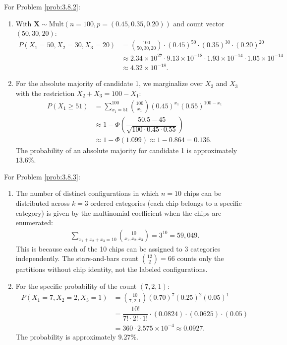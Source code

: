 \begin{solucion}
	\label{sol:3.8.2}
	For Problem \ref{prob:3.8.2}:
	\begin{enumerate}
		\item With $\bm{X} \sim \text{Mult}(n = 100, p = (0.45, 0.35, 0.20))$ and count vector $(50, 30, 20)$:
		\begin{align*}
			P(X_{1} = 50, X_{2} = 30, X_{3} = 20) &= \binom{100}{50, 30, 20} \cdot (0.45)^{50} \cdot (0.35)^{30} \cdot (0.20)^{20} \\
			&\approx 2.34 \times 10^{27} \cdot 9.13 \times 10^{-18} \cdot 1.93 \times 10^{-14} \cdot 1.05 \times 10^{-14} \\
			&\approx 4.32 \times 10^{-18}.
		\end{align*}
		\item For the absolute majority of candidate 1, we marginalize over $X_{2}$ and $X_{3}$ with the restriction $X_{2} + X_{3} = 100 - X_{1}$:
		\begin{align*}
			P(X_{1} \ge 51) &= \sum_{x_{1}=51}^{100} \binom{100}{x_{1}} (0.45)^{x_{1}} (0.55)^{100-x_{1}} \\
			&\approx 1 - \Phi\left(\dfrac{50.5 - 45}{\sqrt{100 \cdot 0.45 \cdot 0.55}}\right) \\
			&\approx 1 - \Phi(1.099) \approx 1 - 0.864 = 0.136.
		\end{align*}
		The probability of an absolute majority for candidate 1 is approximately $13.6\%$.
	\end{enumerate}
\end{solucion}

\begin{solucion}
	\label{sol:3.8.3}
	For Problem \ref{prob:3.8.3}:
	\begin{enumerate}
		\item The number of distinct configurations in which $n = 10$ chips can be distributed across $k = 3$ ordered categories (each chip belongs to a specific category) is given by the multinomial coefficient when the chips are enumerated:
		\begin{align*}
			\sum_{x_{1}+x_{2}+x_{3}=10} \binom{10}{x_{1}, x_{2}, x_{3}} = 3^{10} = 59{,}049.
		\end{align*}
		This is because each of the 10 chips can be assigned to 3 categories independently. The stars-and-bars count $\binom{12}{2} = 66$ counts only the partitions without chip identity, not the labeled configurations.
		\item For the specific probability of the count $(7, 2, 1)$:
		\begin{align*}
			P(X_{1} = 7, X_{2} = 2, X_{3} = 1) &= \binom{10}{7, 2, 1} (0.70)^{7} (0.25)^{2} (0.05)^{1} \\
			&= \dfrac{10!}{7! \cdot 2! \cdot 1!} \cdot (0.0824) \cdot (0.0625) \cdot (0.05) \\
			&= 360 \cdot 2.575 \times 10^{-4} \approx 0.0927.
		\end{align*}
		The probability is approximately $9.27\%$.
	\end{enumerate}
\end{solucion}

